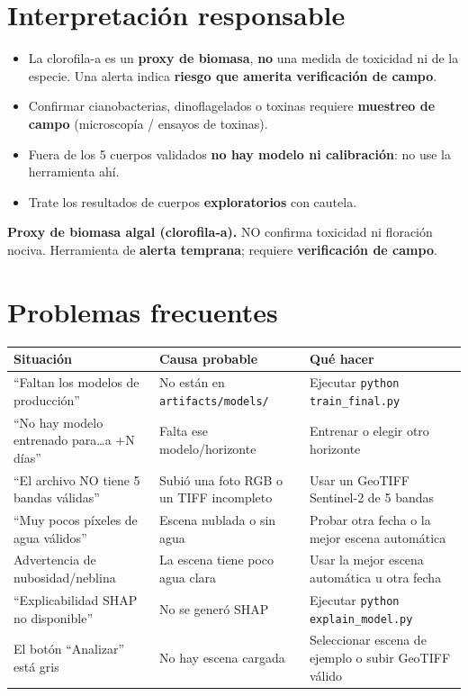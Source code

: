 \documentclass[11pt]{article}
\begin{document}
\section{Interpretaci\'on responsable}
\begin{itemize}
  \item La clorofila-a es un \textbf{proxy de biomasa}, \textbf{no} una medida de toxicidad
  ni de la especie. Una alerta indica \textbf{riesgo que amerita verificaci\'on de campo}.
  \item Confirmar cianobacterias, dinoflagelados o toxinas requiere \textbf{muestreo de
  campo} (microscop\'ia / ensayos de toxinas).
  \item Fuera de los 5 cuerpos validados \textbf{no hay modelo ni calibraci\'on}: no use la
  herramienta ah\'i.
  \item Trate los resultados de cuerpos \textbf{exploratorios} con cautela.
\end{itemize}

\begin{aviso}
\textbf{Proxy de biomasa algal (clorofila-a).} NO confirma toxicidad ni floraci\'on
nociva. Herramienta de \textbf{alerta temprana}; requiere \textbf{verificaci\'on de campo}.
\end{aviso}

\section{Problemas frecuentes}
\begin{tabularx}{\textwidth}{L L L}
\toprule
\textbf{Situaci\'on} & \textbf{Causa probable} & \textbf{Qu\'e hacer} \\
\midrule
``Faltan los modelos de producci\'on'' & No est\'an en \texttt{artifacts/models/} & Ejecutar \texttt{python train\_final.py} \\
``No hay modelo entrenado para\ldots a +N d\'ias'' & Falta ese modelo/horizonte & Entrenar o elegir otro horizonte \\
``El archivo NO tiene 5 bandas v\'alidas'' & Subi\'o una foto RGB o un TIFF incompleto & Usar un GeoTIFF Sentinel-2 de 5 bandas \\
``Muy pocos p\'ixeles de agua v\'alidos'' & Escena nublada o sin agua & Probar otra fecha o la mejor escena autom\'atica \\
Advertencia de nubosidad/neblina & La escena tiene poco agua clara & Usar la mejor escena autom\'atica u otra fecha \\
``Explicabilidad SHAP no disponible'' & No se gener\'o SHAP & Ejecutar \texttt{python explain\_model.py} \\
El bot\'on ``Analizar'' est\'a gris & No hay escena cargada & Seleccionar escena de ejemplo o subir GeoTIFF v\'alido \\
\bottomrule
\end{tabularx}
\end{document}
